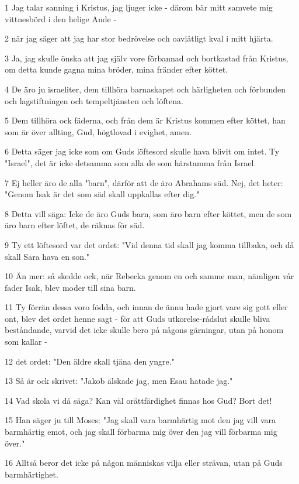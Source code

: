 \par 1 Jag talar sanning i Kristus, jag ljuger icke - därom bär mitt samvete mig vittnesbörd i den helige Ande -
\par 2 när jag säger att jag har stor bedrövelse och oavlåtligt kval i mitt hjärta.
\par 3 Ja, jag skulle önska att jag själv vore förbannad och bortkastad från Kristus, om detta kunde gagna mina bröder, mina fränder efter köttet.
\par 4 De äro ju israeliter, dem tillhöra barnaskapet och härligheten och förbunden och lagstiftningen och tempeltjänsten och löftena.
\par 5 Dem tillhöra ock fäderna, och från dem är Kristus kommen efter köttet, han som är över allting, Gud, högtlovad i evighet, amen.
\par 6 Detta säger jag icke som om Guds löftesord skulle hava blivit om intet. Ty "Israel", det är icke detsamma som alla de som härstamma från Israel.
\par 7 Ej heller äro de alla "barn", därför att de äro Abrahams säd. Nej, det heter: "Genom Isak är det som säd skall uppkallas efter dig."
\par 8 Detta vill säga: Icke de äro Guds barn, som äro barn efter köttet, men de som äro barn efter löftet, de räknas för säd.
\par 9 Ty ett löftesord var det ordet: "Vid denna tid skall jag komma tillbaka, och då skall Sara hava en son."
\par 10 Än mer: så skedde ock, när Rebecka genom en och samme man, nämligen vår fader Isak, blev moder till sina barn.
\par 11 Ty förrän dessa voro födda, och innan de ännu hade gjort vare sig gott eller ont, blev det ordet henne sagt - för att Guds utkorelse-rådslut skulle bliva beståndande, varvid det icke skulle bero på någons gärningar, utan på honom som kallar -
\par 12 det ordet: "Den äldre skall tjäna den yngre."
\par 13 Så är ock skrivet: "Jakob älskade jag, men Esau hatade jag."
\par 14 Vad skola vi då säga? Kan väl orättfärdighet finnas hos Gud? Bort det!
\par 15 Han säger ju till Moses: "Jag skall vara barmhärtig mot den jag vill vara barmhärtig emot, och jag skall förbarma mig över den jag vill förbarma mig över."
\par 16 Alltså beror det icke på någon människas vilja eller strävan, utan på Guds barmhärtighet.
